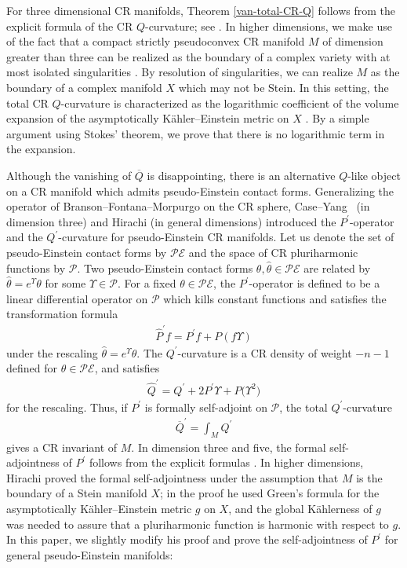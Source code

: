 \documentclass[pdftex]{sigma}
\numberwithin{equation}{section}
\begin{document}
For three dimensional CR manifolds, Theorem \ref{van-total-CR-Q} follows from the explicit formula of the CR $Q$-curvature; see \cite{Fefferman/Hirachi}. In higher dimensions, we make use of the fact that a compact strictly pseudoconvex CR manifold $M$ of dimension greater than three can be realized as the boundary of a complex variety with at most isolated singularities \cite{Monvel, Harvey/Lawson:1975,
Harvey/Lawson:1977}. By resolution of singularities, we can realize $M$ as the boundary of a complex manifold $X$ which may not be Stein. In this setting, the total CR $Q$-curvature is characterized as the logarithmic coef\/f\/icient of the volume expansion of the asymptotically K\"ahler--Einstein metric on $X$ \cite{Seshadri}. By a simple argument using Stokes' theorem, we prove that there is no logarithmic term in the expansion.

Although the vanishing of $\overline{Q}$ is disappointing, there is an alternative $Q$-like object on a CR manifold which admits pseudo-Einstein contact forms. Generalizing the operator of Branson--Fontana--Morpurgo \cite{Branson/Fontana/Morpurgo} on the CR sphere, Case--Yang~\cite{Case/Yang} (in dimension three) and Hirachi \cite{Hirachi} (in general dimensions) introduced the $P^\prime$-operator and the $Q^\prime$-curvature for pseudo-Einstein CR manifolds. Let us denote the set of pseudo-Einstein contact forms by $\mathcal{PE}$ and the space of CR pluriharmonic functions by $\mathcal{P}$. Two pseudo-Einstein contact forms $\theta, \widehat\theta\in\mathcal{PE}$ are related by $\widehat\theta=e^\Upsilon \theta$ for some $\Upsilon\in\mathcal{P}$. For a f\/ixed $\theta\in\mathcal{PE}$, the $P^\prime$-operator is def\/ined to be a linear dif\/ferential operator on $\mathcal{P}$ which kills constant functions and satisf\/ies the transformation formula
\begin{gather*}
\widehat P^\prime f=P^\prime f+P(f\Upsilon)
\end{gather*}
under the rescaling $\widehat\theta=e^{\Upsilon}\theta$. The $Q^\prime$-curvature is a CR density of weight $-n-1$ def\/ined for $\theta\in\mathcal{PE}$, and satisf\/ies
\begin{gather*}
\widehat Q^\prime=Q^\prime+2P^\prime \Upsilon+P\big(\Upsilon^2\big)
\end{gather*}
for the rescaling. Thus, if $P^\prime$ is formally self-adjoint on $\mathcal{P}$, the total $Q^\prime$-curvature
\begin{gather*}
\overline{Q}^\prime=\int_M Q^\prime
\end{gather*}
gives a CR invariant of $M$. In dimension three and f\/ive, the formal self-adjointness of $P^\prime$ follows from the explicit formulas \cite{Case/Gover, Case/Yang}. In higher dimensions, Hirachi \cite[Theorem~4.5]{Hirachi} proved the formal self-adjointness under the assumption that $M$ is the boundary of a Stein manifold $X$; in the proof he used Green's formula for the asymptotically K\"ahler--Einstein metric $g$ on $X$, and the global K\"ahlerness of $g$ was needed to assure that a pluriharmonic function is harmonic with respect to $g$. In this paper, we slightly modify his proof and prove the self-adjointness of $P^\prime$ for general pseudo-Einstein manifolds:
\end{document}
